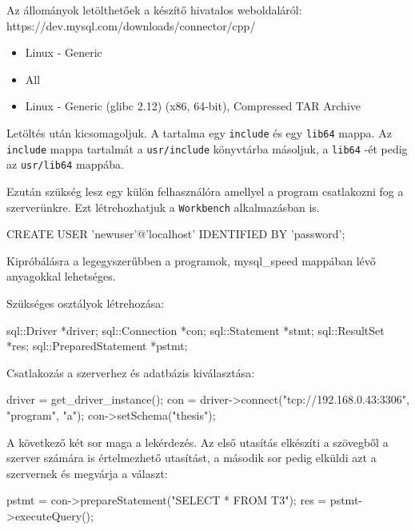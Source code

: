 
Az állományok letölthetőek a készítő hivatalos weboldaláról:\newline
https://dev.mysql.com/downloads/connector/cpp/
\begin{itemize}
	\item Linux - Generic
	\item All
	\item Linux - Generic (glibc 2.12) (x86, 64-bit), Compressed TAR Archive
\end{itemize}
Letöltés után kicsomagoljuk. A tartalma egy \texttt{include} és egy \texttt{lib64} mappa. Az \texttt{include} mappa tartalmát a \texttt{usr/include} könyvtárba másoljuk, a \texttt{lib64} -ét pedig az \texttt{usr/lib64} mappába.

Ezután szükség lesz egy külön felhasználóra amellyel a program csatlakozni fog a szerverünkre. Ezt létrehozhatjuk a \texttt{Workbench} alkalmazásban is.
\begin{python}
	CREATE USER 'newuser'@'localhost' IDENTIFIED BY 'password';
\end{python}


Kipróbálásra a legegyszerűbben a programok, mysql\_speed mappában lévő anyagokkal lehetséges.

Szükséges osztályok létrehozása:
\begin{cpp}
	sql::Driver *driver;
	sql::Connection *con;
	sql::Statement *stmt;
	sql::ResultSet *res;
	sql::PreparedStatement *pstmt;
\end{cpp}
Csatlakozás a szerverhez és adatbázis kiválasztása:
\begin{cpp}
	driver = get_driver_instance();
	con = driver->connect("tcp://192.168.0.43:3306", "program", "a");
	con->setSchema("thesis");
\end{cpp}
A következő két sor maga a lekérdezés. Az első utasítás elkészíti a szövegből a szerver számára is értelmezhető utasítást, a második sor pedig elküldi azt a szervernek és megvárja a választ:
\begin{cpp}
	pstmt = con->prepareStatement("SELECT * FROM T3");
	res = pstmt->executeQuery();
\end{cpp}

